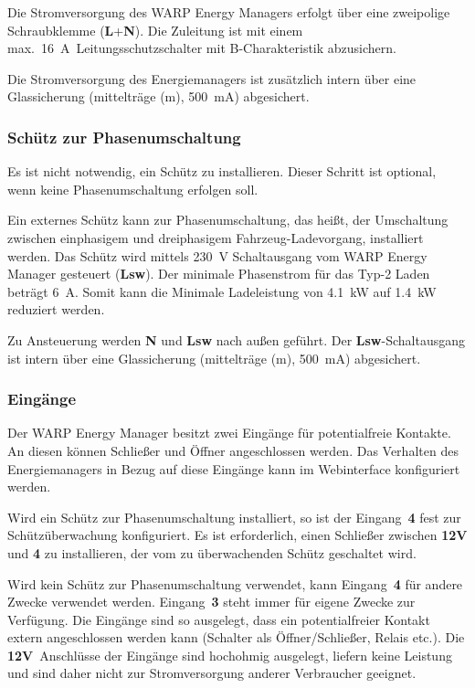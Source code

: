 \documentclass[a4paper,10pt]{article}
\newcommand{\hint}[1]{\begin{tcolorbox}[colback=boxgray,colframe=black,coltext=
white,title=Hinweis,left*=2mm,right*=2mm,boxsep=1mm,bottom=1mm,top=1mm]#1\end{tcolorbox}}
\begin{document}
\begin{multicols*}{2}
	Die Stromversorgung des WARP Energy Managers erfolgt über eine zweipolige
	Schraubklemme (\textbf{L}+\textbf{N}). Die Zuleitung ist mit einem
	max.~\SI{16}{\ampere}~Leitungsschutzschalter mit B-Charakteristik abzusichern.

	Die Stromversorgung des Energiemanagers ist zusätzlich intern über eine Glassicherung
	(mittelträge (m), \SI{500}{\milli\ampere}) abgesichert.

	\subsubsection{Schütz zur Phasenumschaltung}
	\hint{Es ist nicht notwendig, ein Schütz zu installieren. Dieser Schritt ist optional,
	wenn keine Phasenumschaltung erfolgen soll.}

	Ein externes Schütz kann zur Phasenumschaltung, das heißt, der Umschaltung
	zwischen einphasigem und dreiphasigem Fahrzeug-Ladevorgang, installiert werden. Das
	Schütz wird mittels \SI{230}{\volt} Schaltausgang vom WARP Energy Manager gesteuert
	(\textbf{Lsw}).
	Der minimale Phasenstrom für das Typ-2 Laden beträgt \SI{6}{\ampere}. Somit
	kann die Minimale Ladeleistung von \SI{4.1}{\kilo\watt} auf
	\SI{1.4}{\kilo\watt} reduziert werden.

	Zu Ansteuerung werden \textbf{N} und \textbf{Lsw} nach außen geführt. Der
	\textbf{Lsw}-Schaltausgang ist intern über eine Glassicherung
	(mittelträge (m), \SI{500}{\milli\ampere}) abgesichert.


	\subsubsection{Eingänge}
	Der WARP Energy Manager besitzt zwei Eingänge für potentialfreie Kontakte.
	An diesen können Schließer und Öffner angeschlossen werden. Das Verhalten des
	Energiemanagers in Bezug auf diese Eingänge kann im Webinterface konfiguriert werden.

	Wird ein Schütz zur Phasenumschaltung installiert, so ist der Eingang~\textbf{4}
	fest zur Schützüberwachung konfiguriert. Es ist erforderlich, einen Schließer zwischen
	\textbf{12V} und \textbf{4} zu installieren, der vom zu überwachenden Schütz geschaltet wird.

	Wird kein Schütz zur Phasenumschaltung verwendet, kann Eingang~\textbf{4} für
	andere Zwecke verwendet werden. Eingang~\textbf{3} steht immer
	für eigene Zwecke zur Verfügung. Die Eingänge sind so ausgelegt, dass ein potentialfreier
	Kontakt extern angeschlossen werden kann (Schalter als Öffner/Schließer, Relais etc.).
	Die \textbf{12V}~Anschlüsse der Eingänge sind hochohmig ausgelegt, liefern
	keine Leistung und sind daher nicht zur Stromversorgung anderer Verbraucher
	geeignet.


\end{multicols*}
\end{document}
